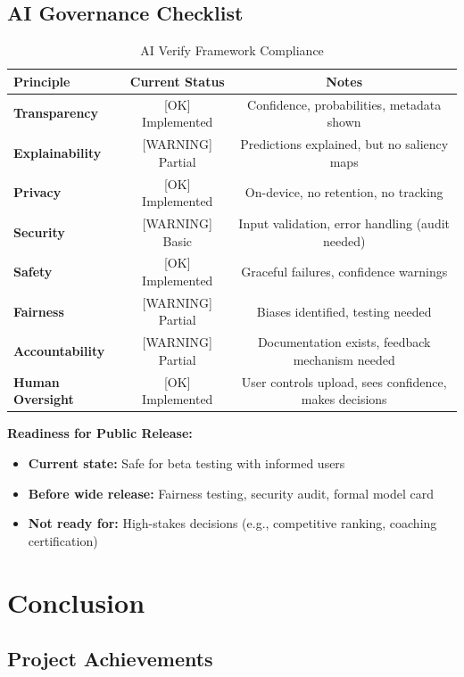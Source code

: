 \documentclass[11pt,a4paper]{article}
\begin{document}
\subsection{AI Governance Checklist}

\begin{table}[H]
\centering
\caption{AI Verify Framework Compliance}
\small
\begin{tabular}{lcc}
\toprule
Principle & Current Status & Notes \\
\midrule
\textbf{Transparency} & [OK] Implemented & Confidence, probabilities, metadata shown \\
\textbf{Explainability} & [WARNING] Partial & Predictions explained, but no saliency maps \\
\textbf{Privacy} & [OK] Implemented & On-device, no retention, no tracking \\
\textbf{Security} & [WARNING] Basic & Input validation, error handling (audit needed) \\
\textbf{Safety} & [OK] Implemented & Graceful failures, confidence warnings \\
\textbf{Fairness} & [WARNING] Partial & Biases identified, testing needed \\
\textbf{Accountability} & [WARNING] Partial & Documentation exists, feedback mechanism needed \\
\textbf{Human Oversight} & [OK] Implemented & User controls upload, sees confidence, makes decisions \\
\bottomrule
\end{tabular}
\end{table}

\textbf{Readiness for Public Release:}

\begin{itemize}
\item [OK] \textbf{Current state:} Safe for beta testing with informed users
\item [WARNING] \textbf{Before wide release:} Fairness testing, security audit, formal model card
\item [FAIL] \textbf{Not ready for:} High-stakes decisions (e.g., competitive ranking, coaching certification)
\end{itemize}

\section{Conclusion}

\subsection{Project Achievements}
\end{document}
